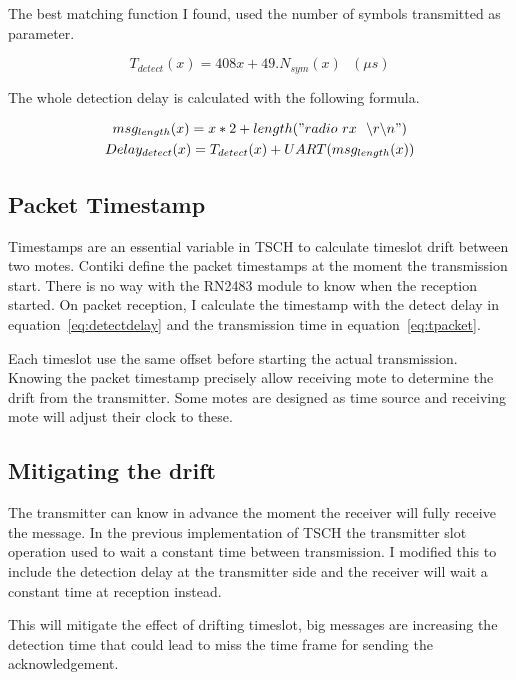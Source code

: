 The best matching function I found, used the number of symbols transmitted as
parameter.

\begin{equation}
  \label{eq:detectcomp}
  T_{detect}(x) = 408x + 49 . N_{sym}(x) \ \ \ (\mu s)
\end{equation}

The whole detection delay is calculated with the following formula.

\begin{gather}
  msg_{length}(x) = x * 2 + length("radio~rx~~\backslash r \backslash n") \\
  \label{eq:detectdelay}
  Delay_{detect}(x) = T_{detect}(x) + UART(msg_{length}(x))
\end{gather}

\subsection{Packet Timestamp}

Timestamps are an essential variable in TSCH to calculate timeslot drift
between two motes. 
Contiki define the packet timestamps at the moment the transmission start.
There is no way with the RN2483 module to know when the reception started.
On packet reception, I calculate the timestamp with the detect delay 
in equation~\ref{eq:detectdelay} and the transmission time in
equation~\ref{eq:tpacket}.

Each timeslot use the same offset before starting the actual transmission.
Knowing the packet timestamp precisely allow receiving mote to determine the
drift from the transmitter. Some motes are designed as time source and
receiving mote will adjust their clock to these.

\subsection{Mitigating the drift}

The transmitter can know in advance the moment the receiver will fully
receive the message. In the previous implementation of TSCH the transmitter
slot operation used to wait a constant time between transmission. I modified
this to include the detection delay at the transmitter side and the receiver
will wait a constant time at reception instead.

This will mitigate the effect of drifting timeslot, big messages are increasing
the detection time that could lead to miss the time frame for sending the
acknowledgement.

